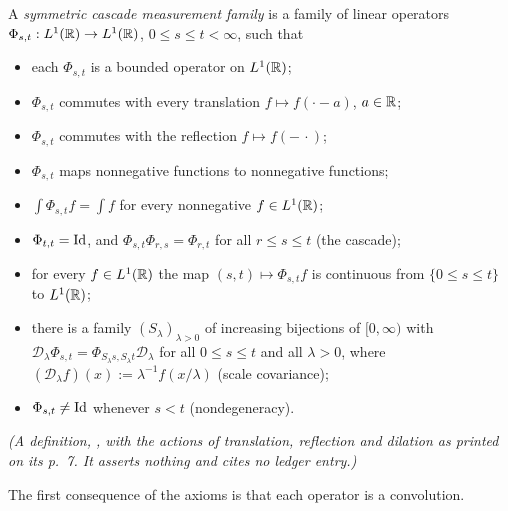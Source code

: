 \begin{definition}
\label{def:cascade-measurement-family}
\leanok
A \emph{symmetric cascade measurement family} is a family of linear operators
$\Phi_{s,t} : L^1(\mathbb{R}) \to L^1(\mathbb{R})$, $0 \le s \le t < \infty$, such that
\begin{itemize}
\item[(A1)] each $\Phi_{s,t}$ is a bounded operator on $L^1(\mathbb{R})$;
\item[(A2)] $\Phi_{s,t}$ commutes with every translation $f \mapsto f(\cdot - a)$, $a \in \mathbb{R}$;
\item[(A3)] $\Phi_{s,t}$ commutes with the reflection $f \mapsto f(-\,\cdot)$;
\item[(A4)] $\Phi_{s,t}$ maps nonnegative functions to nonnegative functions;
\item[(A5)] $\int\Phi_{s,t}f = \int f$ for every nonnegative $f \in L^1(\mathbb{R})$;
\item[(A6)] $\Phi_{t,t} = \mathrm{Id}$, and $\Phi_{s,t}\Phi_{r,s} = \Phi_{r,t}$ for all $r \le s \le t$
(the cascade);
\item[(A7)] for every $f \in L^1(\mathbb{R})$ the map $(s,t) \mapsto \Phi_{s,t}f$ is continuous from
$\{0 \le s \le t\}$ to $L^1(\mathbb{R})$;
\item[(A8)] there is a family $(S_\lambda)_{\lambda > 0}$ of increasing bijections of $[0,\infty)$
with $\mathcal{D}_\lambda\Phi_{s,t} = \Phi_{S_\lambda s, S_\lambda t}\mathcal{D}_\lambda$ for all
$0 \le s \le t$ and all $\lambda > 0$, where $(\mathcal{D}_\lambda f)(x) := \lambda^{-1}f(x/\lambda)$
(scale covariance);
\item[(ND)] $\Phi_{s,t} \ne \mathrm{Id}$ whenever $s < t$ (nondegeneracy).
\end{itemize}
\statusT\quad\emph{(A definition, , with the actions of
translation, reflection and dilation as printed on its p.~7. It asserts nothing and cites no
ledger entry.)}
\end{definition}

The first consequence of the axioms is that each operator is a convolution.

